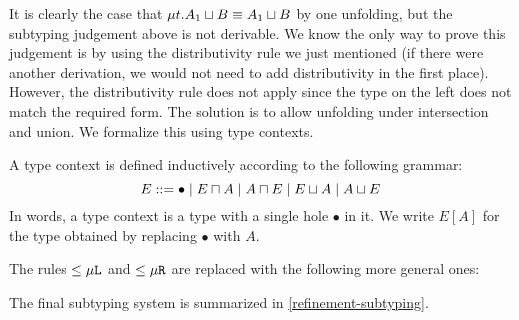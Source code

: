 It is clearly the case that $\mu{t} . {A_1 \mathbin{\sqcup} B} \equiv A_1 \mathbin{\sqcup} B$ by one unfolding, but the subtyping judgement above is not derivable. We know the only way to prove this judgement is by  using the distributivity rule we just mentioned (if there were another derivation, we would not need to add distributivity in the first place). However, the distributivity rule does not apply since the type on the left does not match the required form. The solution is to allow unfolding under intersection and union. We formalize this using type contexts.

\begin{definition}
  A type context is defined inductively according to the following grammar:
  \[ E ::= \bullet \mid E \mathbin{\sqcap} A \mid A \mathbin{\sqcap} E \mid E \mathbin{\sqcup} A \mid A \mathbin{\sqcup} E \]
  In words, a type context is a type with a single hole $\bullet$ in it. We write $E[A]$ for the type obtained by replacing $\bullet$ with $A$.
\end{definition}



The rules $\le{\mu\texttt{L}}$ and $\le{\mu\texttt{R}}$ are replaced with the following more general ones:

The final subtyping system is summarized in \cref{refinement-subtyping}.

